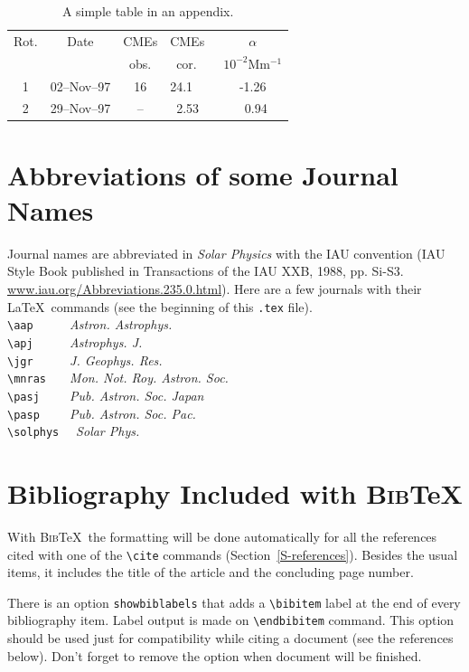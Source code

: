 \documentclass[namedreferences]{solarphysics}
\newcommand{\BibTeX}{\textsc{Bib}\TeX}
\newcommand{\aap}{    {\it Astron. Astrophys.}}
\newcommand{\apj}{    {\it Astrophys. J.}}
\newcommand{\jgr}{    {\it J. Geophys. Res.}}
\newcommand{\mnras}{  {\it Mon. Not. Roy. Astron. Soc.}}
\newcommand{\pasp}{   {\it Pub. Astron. Soc. Pac.}}
\newcommand{\pasj}{   {\it Pub. Astron. Soc. Japan}}
\newcommand{\solphys}{{\it Solar Phys.}}
\begin{document}
\begin{article}
  \begin{table}
   \caption{ A simple table in an appendix. }
   \label{T-appendix}
    \begin{tabular}{ccclc}     %
      \hline                   %
    Rot. & Date & CMEs & CMEs~ & $\alpha$ \\
         &      & obs. & ~cor. & $10^{-2}$Mm$^{-1}$\\
      \hline
    1 & 02--Nov--97 & 16  & 24.1  & -1.26 \\
    2 & 29--Nov--97 & --  & ~2.53 & ~0.94 \\
      \hline
    \end{tabular}
   \end{table}


\section{Abbreviations of some Journal Names} %
    \label{S-appendix}
Journal names are abbreviated in {\it Solar Physics} with the IAU
convention (IAU Style Book
published in Transactions of the IAU XXB, 1988, pp. Si-S3.
\url{www.iau.org/Abbreviations.235.0.html}).  Here are a few journals with their \LaTeX\ 
commands (see the beginning of this \texttt{.tex} file).\\
  \verb+\aap     + \aap \\
  \verb+\apj     + \apj \\
  \verb+\jgr     + \jgr \\
  \verb+\mnras   + \mnras \\
  \verb+\pasj    + \pasj \\
  \verb+\pasp    + \pasp \\
  \verb+\solphys +~ \solphys 
  
\section*{Bibliography Included with \BibTeX } 
  With \BibTeX\ the formatting will be done automatically for all 
the references cited with one
of the \verb+\cite+ commands (Section~\ref{S-references}).
Besides the usual items, it includes the title of the article 
and the concluding page number. 
   
There is an option \texttt{showbiblabels} that adds a \verb+\bibitem+ 
label at the end of every bibliography item. Label output is made on \verb+\endbibitem+ command.
This option should be used 
just for compatibility while citing a document (see the references below). 
Don't forget to remove the option when document will be finished.


\end{article}
\end{document}
